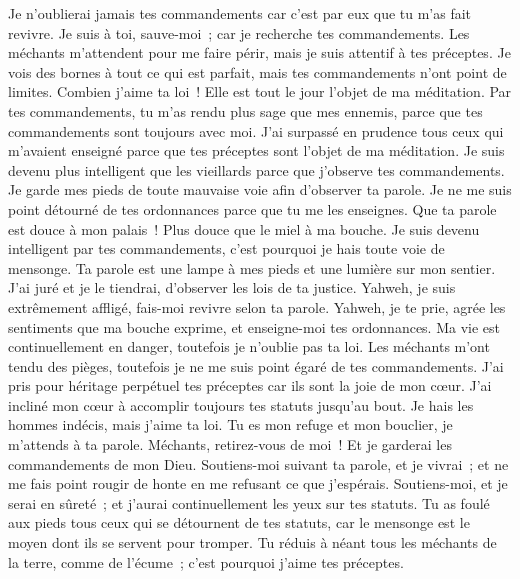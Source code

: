 \begin{multicols}{2}
Je n'oublierai jamais tes commandements car c'est par eux que tu m'as fait revivre.
Je suis à toi, sauve-moi~; car je recherche tes commandements.
Les méchants m'attendent pour me faire périr, mais je suis attentif à tes préceptes.
Je vois des bornes à tout ce qui est parfait, mais tes commandements n'ont point de limites.
 Combien j'aime ta loi~! Elle est tout le jour l'objet de ma méditation.
Par tes commandements, tu m'as rendu plus sage que mes ennemis, parce que tes commandements sont toujours avec moi.
J'ai surpassé en prudence tous ceux qui m'avaient enseigné parce que tes préceptes sont l'objet de ma méditation.
Je suis devenu plus intelligent que les vieillards parce que j'observe tes commandements.
Je garde mes pieds de toute mauvaise voie afin d'observer ta parole.
Je ne me suis point détourné de tes ordonnances parce que tu me les enseignes.
Que ta parole est douce à mon palais~! Plus douce que le miel à ma bouche.
Je suis devenu intelligent par tes commandements, c'est pourquoi je hais toute voie de mensonge.
 Ta parole est une lampe à mes pieds et une lumière sur mon sentier.
J'ai juré et je le tiendrai, d'observer les lois de ta justice.
Yahweh, je suis extrêmement affligé, fais-moi revivre selon ta parole.
Yahweh, je te prie, agrée les sentiments que ma bouche exprime, et enseigne-moi tes ordonnances.
Ma vie est continuellement en danger, toutefois je n'oublie pas ta loi.
Les méchants m'ont tendu des pièges, toutefois je ne me suis point égaré de tes commandements.
J'ai pris pour héritage perpétuel tes préceptes car ils sont la joie de mon cœur.
J'ai incliné mon cœur à accomplir toujours tes statuts jusqu'au bout.
 Je hais les hommes indécis, mais j'aime ta loi.
Tu es mon refuge et mon bouclier, je m'attends à ta parole.
Méchants, retirez-vous de moi~! Et je garderai les commandements de mon Dieu.
Soutiens-moi suivant ta parole, et je vivrai~; et ne me fais point rougir de honte en me refusant ce que j'espérais.
Soutiens-moi, et je serai en sûreté~; et j'aurai continuellement les yeux sur tes statuts.
Tu as foulé aux pieds tous ceux qui se détournent de tes statuts, car le mensonge est le moyen dont ils se servent pour tromper.
Tu réduis à néant tous les méchants de la terre, comme de l'écume~; c'est pourquoi j'aime tes préceptes.

\end{multicols}
